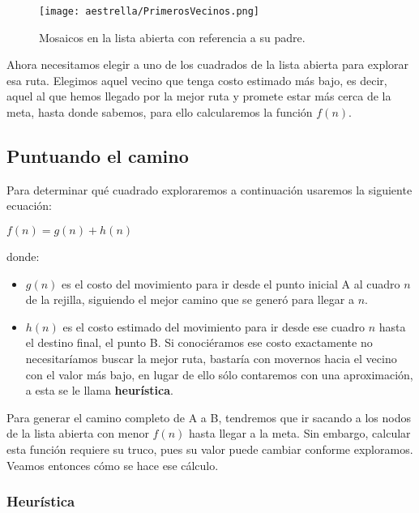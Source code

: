 \begin{figure}[h]
  \centering
  \texttt{[image: aestrella/PrimerosVecinos.png]}
  \caption{Mosaicos en la lista abierta con referencia a su padre.}
  \label{fig:fig2P4}
\end{figure}

Ahora necesitamos elegir a uno de los cuadrados de la lista abierta para explorar esa ruta. Elegimos aquel vecino que tenga costo estimado más bajo, es decir, aquel al que hemos llegado por la mejor ruta y promete estar más cerca de la meta, hasta donde sabemos, para ello calcularemos la función $f(n)$.

\subsection{Puntuando el camino}

Para determinar qué cuadrado exploraremos a continuación usaremos la siguiente ecuación:

\begin{center}
\(f(n) = g(n) + h(n)\)
\end{center}

donde:

\begin{itemize}
  \item \(g(n)\) es el costo del movimiento para ir desde el punto inicial A al cuadro \(n\) de la rejilla, siguiendo el mejor camino que se generó para llegar a $n$.

  \item \(h(n)\) es el costo estimado del movimiento para ir desde ese cuadro \(n\) hasta el destino final, el punto B. Si conociéramos ese costo exactamente no necesitaríamos buscar la mejor ruta, bastaría con movernos hacia el vecino con el valor más bajo, en lugar de ello sólo contaremos con una aproximación, a esta se le llama \textbf{heurística}.
\end{itemize}

Para generar el camino completo de A a B, tendremos que ir sacando a los nodos de la lista abierta con menor \(f(n)\) hasta llegar a la meta.  Sin embargo, calcular esta función requiere su truco, pues su valor puede cambiar conforme exploramos.  Veamos entonces cómo se hace ese cálculo.


\subsubsection{Heurística}

